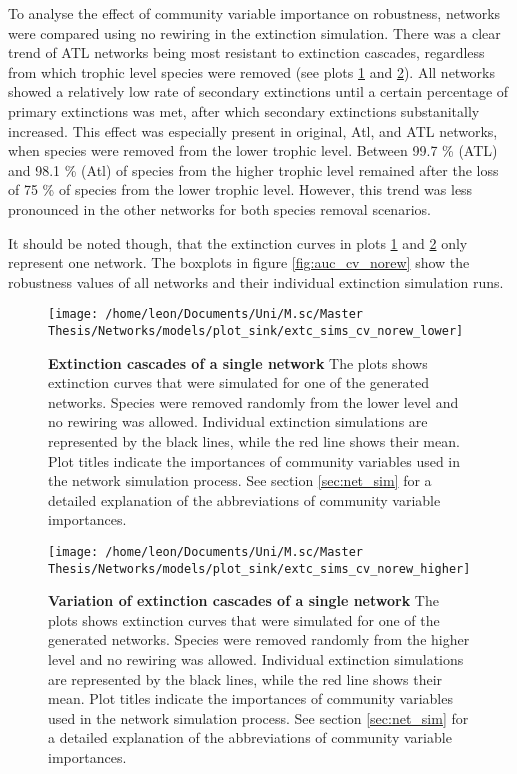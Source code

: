 \documentclass[12pt,a4paper]{article}
\begin{document}
To analyse the effect of community variable importance on robustness, networks were compared using no rewiring in the extinction simulation. There was a clear trend of ATL networks being most resistant to extinction cascades, regardless from which trophic level species were removed (see plots \ref{fig:extc_cv_norew_lower} and \ref{fig:extc_cv_norew_higher}). All networks showed a relatively low rate of secondary extinctions until a certain percentage of primary extinctions was met, after which secondary extinctions substanitally increased. This effect was especially present in original, Atl, and ATL networks, when species were removed from the lower trophic level.  Between 99.7 \% (ATL) and 98.1 \% (Atl) of species from the higher trophic level remained after the loss of 75 \% of species from the lower trophic level. However, this trend was less pronounced in the other networks for both species removal scenarios. \par


It should be noted though, that the extinction curves in plots \ref{fig:extc_cv_norew_lower} and \ref{fig:extc_cv_norew_higher} only represent one network. The boxplots in figure \ref{fig:auc_cv_norew} show the robustness values of all networks and their individual extinction simulation runs.
\begin{figure}[H]
	 \texttt{[image: /home/leon/Documents/Uni/M.sc/Master Thesis/Networks/models/plot\_sink/extc\_sims\_cv\_norew\_lower]}
	 \caption{\textbf{Extinction cascades of a single network} The plots shows extinction curves that were simulated for one of the generated networks. Species were removed randomly from the lower level and no rewiring was allowed. Individual extinction simulations are represented by the black lines, while the red line shows their mean. Plot titles indicate the importances of community variables used in the network simulation process. See section \ref{sec:net_sim} for a detailed explanation of the abbreviations of community variable importances.}
	 \label{fig:extc_cv_norew_lower}
\end{figure}


\begin{figure}[H]
	 \texttt{[image: /home/leon/Documents/Uni/M.sc/Master Thesis/Networks/models/plot\_sink/extc\_sims\_cv\_norew\_higher]}
	 \caption{\textbf{Variation of extinction cascades of a single network} The plots shows extinction curves that were simulated for one of the generated networks. Species were removed randomly from the higher level and no rewiring was allowed. Individual extinction simulations are represented by the black lines, while the red line shows their mean. Plot titles indicate the importances of community variables used in the network simulation process. See section \ref{sec:net_sim} for a detailed explanation of the abbreviations of community variable importances.}
	 \label{fig:extc_cv_norew_higher}
\end{figure}
\end{document}
